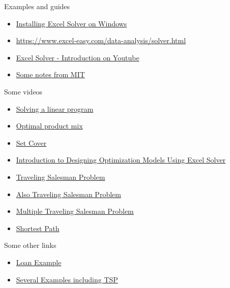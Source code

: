 \begin{resource}
Examples and guides
\begin{itemize}
\item \href{https://www.youtube.com/watch?v=LKV6fT8xApA&ab_channel=JoshuaEmmanuel}{Installing Excel Solver on Windows}
\item \url{https://www.excel-easy.com/data-analysis/solver.html}
\item \href{https://www.youtube.com/watch?v=dRm5MEoA3OI&ab_channel=LeilaGharani}{Excel Solver - Introduction on Youtube}

\item \href{https://ocw.mit.edu/courses/sloan-school-of-management/15-053-optimization-methods-in-management-science-spring-2013/tutorials/MIT15_053S13_tut03.pdf}{Some notes from MIT}
\end{itemize}
Some videos
\begin{itemize}
\item \href{https://www.youtube.com/watch?v=V5DmekIFenA}{Solving a linear program}
\item \href{https://www.youtube.com/watch?v=6xa1x_Iqjzg}{Optimal product mix}
\item \href{https://www.youtube.com/watch?v=vpodCzRtUMU}{Set Cover}

\item \href{https://www.youtube.com/watch?v=tKV24jzZ10s}{Introduction to Designing Optimization Models Using Excel Solver}

\item \href{https://www.youtube.com/watch?v=-E3rSoClgMI}{Traveling Salesman Problem}

\item \href{https://www.youtube.com/watch?v=UQYJvSjXE6I}{Also Traveling Salesman Problem}

\item \href{https://www.youtube.com/watch?v=owHq3Mbniqo}{Multiple Traveling Salesman Problem}

\item \href{https://www.youtube.com/watch?v=JkZkGxVZ8ao}{Shortest Path}

\end{itemize}
Some other links
\begin{itemize}
\item \href{https://github.com/lobodemonte/excel-solver-loan-example}{Loan Example}

\item \href{https://github.com/Bhargavanarasimhan/Excel-Solver-Files}{Several Examples including TSP}
\end{itemize}
\end{resource}

